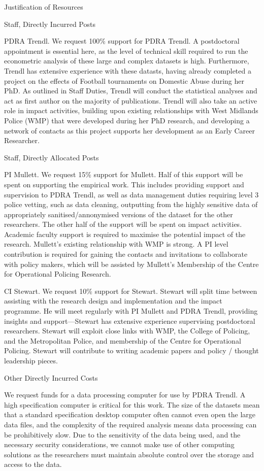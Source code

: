 Justification of Resources

Staff, Directly Incurred Posts

PDRA Trendl. We request 100\% support for PDRA Trendl. A postdoctoral appointment is essential here, as the level of technical skill required to run the econometric analysis of these large and complex datasets is high. Furthermore, Trendl has extensive experience with these datasts, having already completed a project on the effects of Football tournaments on Domestic Abuse during her PhD. As outlined in Staff Duties, Trendl will conduct the statistical analyses and act as first author on the majority of publications. Trendl will also take an active role in impact activities, building upon existing relationships with West Midlands Police (WMP) that were developed during her PhD research, and developing a network of contacts as this project supports her development as an Early Career Researcher. 

Staff, Directly Allocated Posts

PI Mullett. We request 15\% support for Mullett. Half of this support will be spent on supporting the empirical work. This includes providing support and supervision to PDRA Trendl, as well as data management duties requiring level 3 police vetting, such as data cleaning, outputting from the highly sensitive data of appropriately sanitised/annonymised versions of the dataset for the other researchers. The other half of the support will be spent on impact activities. Academic faculty support is required to maximise the potential impact of the research. Mullett's existing relationship with WMP is strong. A PI level contribution is required for gaining the contacts and invitations to collaborate with policy makers, which will be assisted by Mullett's Membership of the Centre for Operational Policing Research.

CI Stewart. We request 10\% support for Stewart. Stewart will split time between assisting with the research design and implementation and the impact programme. He will meet regularly with PI Mullett and PDRA Trendl, providing insights and support---Stewart has extensive experience supervising postdoctoral researchers. Stewart will exploit close links with WMP, the College of Policing, and the Metropolitan Police, and membership of the Centre for Operational Policing. Stewart will contribute to writing academic papers and policy / thought leadership pieces. 

Other Directly Incurred Costs

We request funds for a data processing computer for use by PDRA Trendl. A high specification computer is critical for this work. The size of the datasets mean that a standard specification desktop computer often cannot even open the large data files, and the complexity of the required analysis means data processing can be prohibitively slow. Due to the sensitivity of the data being used, and the necessary security considerations, we cannot make use of other computing solutions as the researchers must maintain absolute control over the storage and access to the data.


